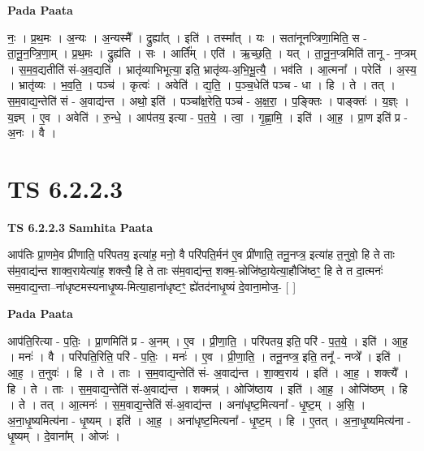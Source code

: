 \documentclass[17pt]{extarticle}
\begin{document}
\textbf{Pada Paata} \newline

नः॒ । प्र॒थ॒मः । अ॒न्यः । अ॒न्यस्मै᳚ । द्रुह्या᳚त् । इति॑ । तस्मा᳚त् । यः । सता॑नूनप्त्रिणा॒मिति॒ स - ता॒नू॒न॒प्त्रि॒णा॒म् । प्र॒थ॒मः । द्रुह्य॑ति । सः । आर्ति᳚म् । एति॑ । ऋ॒च्छ॒ति॒ । यत् । ता॒नू॒न॒प्त्रमिति॑ तानू - न॒प्त्रम् । स॒म॒व॒द्यतीति॑ सं-अ॒व॒द्यति॑ । भ्रातृ॑व्याभिभूत्या॒ इति॒ भ्रातृ॑व्य-अ॒भि॒भू॒त्यै॒ । भव॑ति । आ॒त्मना᳚ । परेति॑ । अ॒स्य॒ । भ्रातृ॑व्यः । भ॒व॒ति॒ । पञ्च॑ । कृत्वः॑ । अवेति॑ । द्य॒ति॒ । प॒ञ्च॒धेति॑ पञ्च - धा । हि । ते । तत् । स॒म॒वाद्य॒न्तेति॑ सं - अ॒वाद्य॑न्त । अथो॒ इति॑ । पञ्चा᳚क्ष॒रेति॒ पञ्च॑ - अ॒क्ष॒रा॒ । प॒ङ्क्तिः । पाङ्क्तः॑ । य॒ज्ञ्ः । य॒ज्ञ्म् । ए॒व । अवेति॑ । रु॒न्धे॒ । आप॑तय॒ इत्या - प॒त॒ये॒ । त्वा॒ । गृ॒ह्णा॒मि॒ । इति॑ । आ॒ह॒ । प्रा॒ण इति॑ प्र - अ॒नः । वै ।  \newline





\section{ TS 6.2.2.3 }

\textbf{TS 6.2.2.3 } \newline
\textbf{Samhita Paata} \newline

आप॑तिः प्रा॒णमे॒व प्री॑णाति॒ परि॑पतय॒ इत्या॑ह॒ मनो॒ वै परि॑पति॒र्मन॑ ए॒व प्री॑णाति॒ तनू॒नप्त्र॒ इत्या॑ह त॒नुवो॒ हि ते ताः स॑म॒वाद्य॑न्त शाक्व॒रायेत्या॑ह॒ शक्त्यै॒ हि ते ताः स॑म॒वाद्य॑न्त॒ शक्म॒-न्नोजि॑ष्ठा॒येत्या॒हौजि॑ष्ठꣳ॒॒ हि ते त दा॒त्मनः॑ सम॒वाद्य॒न्ता--ना॑धृष्टमस्यनाधृ॒ष्य-मित्या॒हाना॑धृष्टꣳ॒॒ ह्ये॑तद॑नाधृ॒ष्यं दे॒वाना॒मोज॒- [  ] \newline

\textbf{Pada Paata} \newline

आप॑ति॒रित्या - प॒तिः॒ । प्रा॒णमिति॑ प्र - अ॒नम् । ए॒व । प्री॒णा॒ति॒ । परि॑पतय॒ इति॒ परि॑ - प॒त॒ये॒ । इति॑ । आ॒ह॒ । मनः॑ । वै । परि॑पति॒रिति॒ परि॑ - प॒तिः॒ । मनः॑ । ए॒व । प्री॒णा॒ति॒ । तनू॒नप्त्र॒ इति॒ तनू᳚ - नप्त्रे᳚ । इति॑ । आ॒ह॒ । त॒नुवः॑ । हि । ते । ताः । स॒म॒वाद्य॒न्तेति॑ सं- अ॒वाद्य॑न्त । शा॒क्व॒राय॑ । इति॑ । आ॒ह॒ । शक्त्यै᳚ । हि । ते । ताः । स॒म॒वाद्य॒न्तेति॑ सं-अ॒वाद्य॑न्त । शक्मन्न्॑ । ओजि॑ष्ठाय । इति॑ । आ॒ह॒ । ओजि॑ष्ठम् । हि । ते । तत् । आ॒त्मनः॑ । स॒म॒वाद्य॒न्तेति॑ सं-अ॒वाद्य॑न्त । अना॑धृष्ट॒मित्यना᳚ - धृ॒ष्ट॒म् । अ॒सि॒ । अ॒ना॒धृ॒ष्यमित्य॑ना - धृ॒ष्यम् । इति॑ । आ॒ह॒ । अना॑धृष्ट॒मित्यना᳚ - धृ॒ष्ट॒म् । हि । ए॒तत् । अ॒ना॒धृ॒ष्यमित्य॑ना - धृ॒ष्यम् । दे॒वाना᳚म् । ओजः॑ ।  \newline
\end{document}
